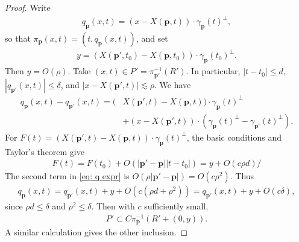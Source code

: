 \documentclass[12pt]{amsart}
\numberwithin{equation}{section}
\newcommand{\1}{\mathbbm{1}}
\newcommand{\p}{\mathbf p}
\begin{document}
\begin{proof}
    Write 
    \begin{align}
        q_\p(x,t) = (x - X(\p,t)) \cdot \gamma_\p(t)^\perp,
    \end{align}
    so that $\pi_\p(x,t)=(t,q_\p(x,t))$, and set 
    \begin{align}
        y=(X(\p',t_0)-X(\p,t_0))\cdot \gamma_\p(t_0)^\perp.
    \end{align}
    Then $y = O(\rho)$.
    Take $(x,t) \in P' = \pi_{\p'}^{-1}(R')$. In particular, $|t-t_0| \leq d$, $|q_{\p'}(x,t)|\leq \delta$, and $|x-X(\p',t)| \lesssim \rho$. We have 
    \begin{align}\label{eq: q expr}
        q_\p(x,t) - q_{\p'}(x,t) = (&X(\p',t)-X(\p,t)) \cdot \gamma_\p(t)^\perp \\
        &+ (x-X(\p',t)) \cdot(\gamma_\p(t)^\perp-\gamma_{\p'}(t)^\perp).
    \end{align}
    For $F(t)  = (X(\p',t)-X(\p,t)) \cdot \gamma_\p(t)^\perp$, the basic conditions and Taylor's theorem give 
    \begin{align}
        F(t) = F(t_0) + O(|\p'-\p| |t-t_0|) = y + O(c\rho d)/
    \end{align}
    The second term in \eqref{eq: q expr} is $O(\rho|\p'-\p|)= O(c \rho^2)$. Thus 
    \begin{align}
        q_\p(x,t) = q_{\p'}(x,t) + y + O(c(\rho d + \rho^2)) = q_{\p'}(x,t) + y + O(c\delta),
    \end{align}
    since $\rho d \leq \delta$ and $\rho^2 \leq \delta$. Then with $c$ sufficiently small, 
    \begin{align}
        P' \subset C \pi_{\p}^{-1}(R' + (0,y)).
    \end{align}
    A similar calculation gives the other inclusion. 
\end{proof}
\end{document}
